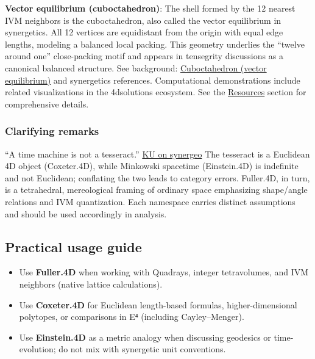 \documentclass[
  10pt,
]{article}
\providecommand{\tightlist}{%
  \setlength{\itemsep}{0pt}\setlength{\parskip}{0pt}}
\begin{document}
\textbf{Vector equilibrium (cuboctahedron)}: The shell formed by the 12
nearest IVM neighbors is the cuboctahedron, also called the vector
equilibrium in synergetics. All 12 vertices are equidistant from the
origin with equal edge lengths, modeling a balanced local packing. This
geometry underlies the ``twelve around one'' close-packing motif and
appears in tensegrity discussions as a canonical balanced structure. See
background:
\href{https://en.wikipedia.org/wiki/Cuboctahedron}{Cuboctahedron (vector
equilibrium)} and synergetics references. Computational demonstrations
include related visualizations in the 4dsolutions ecosystem. See the
\href{07_resources.md}{Resources} section for comprehensive details.

\subsubsection{Clarifying remarks}\label{clarifying-remarks}

``A time machine is not a tesseract.''
\href{https://groups.io/g/synergeo/topic/my_take_on_close_pack/114531919}{KU
on synergeo} The tesseract is a Euclidean 4D object (Coxeter.4D), while
Minkowski spacetime (Einstein.4D) is indefinite and not Euclidean;
conflating the two leads to category errors. Fuller.4D, in turn, is a
tetrahedral, mereological framing of ordinary space emphasizing
shape/angle relations and IVM quantization. Each namespace carries
distinct assumptions and should be used accordingly in analysis.

\subsection{Practical usage guide}\label{practical-usage-guide}

\begin{itemize}
\tightlist
\item
  Use \textbf{Fuller.4D} when working with Quadrays, integer
  tetravolumes, and IVM neighbors (native lattice calculations).
\item
  Use \textbf{Coxeter.4D} for Euclidean length-based formulas,
  higher-dimensional polytopes, or comparisons in E⁴ (including
  Cayley--Menger).
\item
  Use \textbf{Einstein.4D} as a metric analogy when discussing geodesics
  or time-evolution; do not mix with synergetic unit conventions.
\end{itemize}
\end{document}
